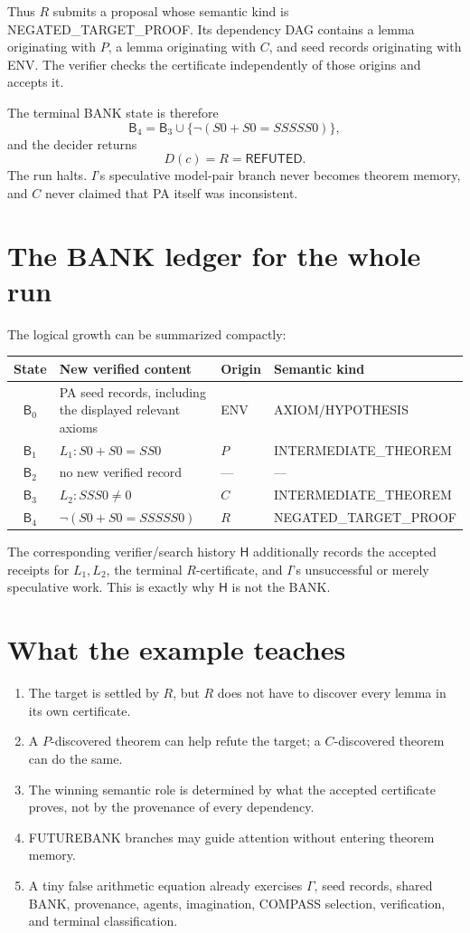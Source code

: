 \documentclass[11pt,openany]{book}
\theoremstyle{definition}
\theoremstyle{remark}
\newcommand{\Bank}{\mathsf{B}}
\newcommand{\Hist}{\mathsf{H}}
\begin{document}
Thus $R$ submits a proposal whose semantic kind is \textsf{NEGATED\_TARGET\_PROOF}. Its dependency DAG contains a lemma originating with $P$, a lemma originating with $C$, and seed records originating with \textsf{ENV}. The verifier checks the certificate independently of those origins and accepts it.

The terminal BANK state is therefore
\[
\Bank_4
=\Bank_3\cup
\bigl\{\neg(S0+S0=SSSSS0)\bigr\},
\]
and the decider returns
\[
\boxed{D(c)=R=\textsf{REFUTED}.}
\]
The run halts. $I$'s speculative model-pair branch never becomes theorem memory, and $C$ never claimed that PA itself was inconsistent.

\section{The BANK ledger for the whole run}
The logical growth can be summarized compactly:
\begin{center}
\begin{tabularx}{0.96\textwidth}{@{}cXll@{}}
\toprule
\textbf{State} & \textbf{New verified content} & \textbf{Origin} & \textbf{Semantic kind}\\
\midrule
$\Bank_0$ & PA seed records, including the displayed relevant axioms & \textsf{ENV} & \textsf{AXIOM/HYPOTHESIS}\\
$\Bank_1$ & $L_1:S0+S0=SS0$ & $P$ & \textsf{INTERMEDIATE\_THEOREM}\\
$\Bank_2$ & no new verified record & --- & ---\\
$\Bank_3$ & $L_2:SSS0\neq0$ & $C$ & \textsf{INTERMEDIATE\_THEOREM}\\
$\Bank_4$ & $\neg(S0+S0=SSSSS0)$ & $R$ & \textsf{NEGATED\_TARGET\_PROOF}\\
\bottomrule
\end{tabularx}
\end{center}

The corresponding verifier/search history $\Hist$ additionally records the accepted receipts for $L_1,L_2$, the terminal $R$-certificate, and $I$'s unsuccessful or merely speculative work. This is exactly why $\Hist$ is not the BANK.

\section{What the example teaches}
\begin{enumerate}
\item The target is settled by $R$, but $R$ does not have to discover every lemma in its own certificate.
\item A $P$-discovered theorem can help refute the target; a $C$-discovered theorem can do the same.
\item The winning semantic role is determined by what the accepted certificate proves, not by the provenance of every dependency.
\item FUTUREBANK branches may guide attention without entering theorem memory.
\item A tiny false arithmetic equation already exercises $\Gamma$, seed records, shared BANK, provenance, agents, imagination, COMPASS selection, verification, and terminal classification.
\end{enumerate}
\end{document}
